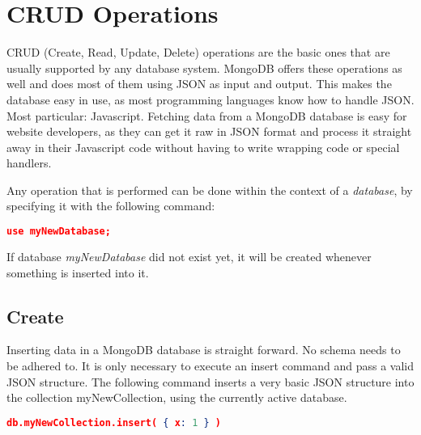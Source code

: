 \documentclass[paper=a4, fontsize=11pt]{scrartcl} %
\numberwithin{equation}{section} %
\numberwithin{figure}{section} %
\numberwithin{table}{section} %
\begin{document}
																							    
																							    
																							      \section{CRUD Operations}
																							    CRUD (Create, Read, Update, Delete) operations are the basic ones that are usually supported by any database system. MongoDB offers these operations as well and does most of them using JSON as input and output. This makes the database easy in use, as most programming languages know how to handle JSON. Most particular: Javascript. Fetching data from a MongoDB database is easy for website developers, as they can get it raw in JSON format and process it straight away in their Javascript code without having to write wrapping code or special handlers. 
																							  
																							    Any operation that is performed can be done within the context of a \emph{database}, by specifying it with the following command:
																							  
																							    \begin{lstlisting}[language=json,firstnumber=1]
																							  use myNewDatabase;
																							  \end{lstlisting}
																							
																							  If database \emph{myNewDatabase} did not exist yet, it will be created whenever something is inserted into it.
																							
																							  \subsection{Create}
																							Inserting data in a MongoDB database is straight forward. No schema needs to be adhered to. It is only necessary to execute an insert command and pass a valid JSON structure. The following command inserts a very basic JSON structure into the collection myNewCollection, using the currently active database.
																						      
																							\begin{lstlisting}[language=json,firstnumber=1]
																							db.myNewCollection.insert( { x: 1 } )
																							\end{lstlisting}
																						      
\end{document}
